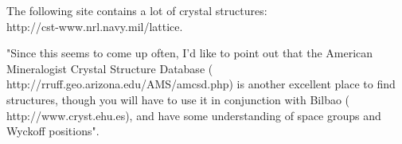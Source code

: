 \documentclass[12pt,a4paper]{article}
\begin{document}
\begin{itemize}
The following site contains a lot of crystal structures:\\
%
                          {http://cst-www.nrl.navy.mil/lattice}. 

"Since this seems to come up often, I'd like to point out that the 
American Mineralogist Crystal Structure Database 
(%
                           {http://rruff.geo.arizona.edu/AMS/amcsd.php})
is another excellent place to find structures, though you will have to use 
it in conjunction with Bilbao
(%
                           {http://www.cryst.ehu.es}),
and have some understanding of space groups and Wyckoff positions".
\end{itemize}
\end{document}
